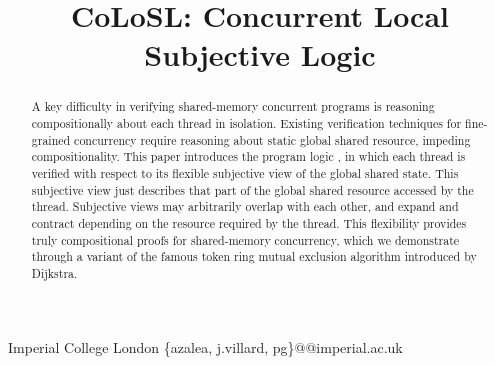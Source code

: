\documentclass[10pt]{sigplanconf}
\begin{document}
%





\title{CoLoSL: Concurrent Local Subjective Logic}
\subtitle{}

            {Imperial College London}
            {\{azalea, j.villard, pg\}@@imperial.ac.uk}

\maketitle


\begin{abstract}
A key difficulty in verifying shared-memory concurrent programs is
reasoning compositionally about each thread in isolation. Existing
verification techniques for fine-grained concurrency require 
reasoning about static global shared resource, impeding compositionality.  This
paper introduces the program logic \colosl, in which each thread is
verified with respect to its flexible subjective view of the global
shared state.
This subjective view  just describes  that part of the global shared resource accessed by the
thread. Subjective views may arbitrarily overlap with each other, and
expand and contract depending on the resource required by the thread.
This flexibility provides truly compositional proofs for shared-memory
concurrency, which we demonstrate through a variant of the famous token ring mutual exclusion algorithm introduced by Dijkstra.
\end{abstract}
\end{document}
